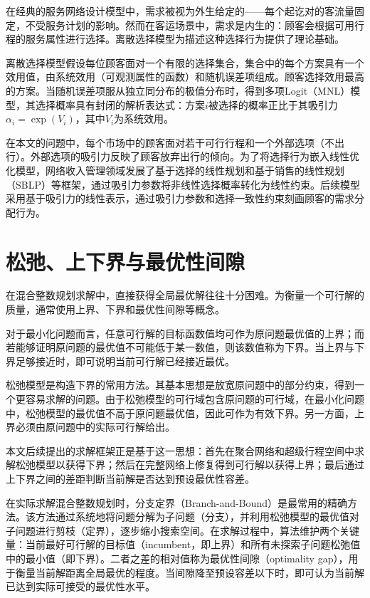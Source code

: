 在经典的服务网络设计模型中，需求被视为外生给定的——每个起讫对的客流量固定，不受服务计划的影响。然而在客运场景中，需求是内生的：顾客会根据可用行程的服务属性进行选择。离散选择模型为描述这种选择行为提供了理论基础。

离散选择模型假设每位顾客面对一个有限的选择集合，集合中的每个方案具有一个效用值，由系统效用（可观测属性的函数）和随机误差项组成\citep{mcfadden1974conditional, benakiva1985discrete, train2009discrete}。顾客选择效用最高的方案。当随机误差项服从独立同分布的极值分布时，得到多项Logit（MNL）模型，其选择概率具有封闭的解析表达式：方案$i$被选择的概率正比于其吸引力$\alpha_i = \exp(V_i)$，其中$V_i$为系统效用。

在本文的问题中，每个市场中的顾客面对若干可行行程和一个外部选项（不出行）。外部选项的吸引力反映了顾客放弃出行的倾向。为了将选择行为嵌入线性优化模型，网络收入管理领域发展了基于选择的线性规划\citep{liu2008choice}和基于销售的线性规划（SBLP）\citep{gallego2015general}等框架，通过吸引力参数将非线性选择概率转化为线性约束。后续模型采用基于吸引力的线性表示，通过吸引力参数和选择一致性约束刻画顾客的需求分配行为。

\section{松弛、上下界与最优性间隙}

在混合整数规划求解中，直接获得全局最优解往往十分困难。为衡量一个可行解的质量，通常使用上界、下界和最优性间隙等概念。

对于最小化问题而言，任意可行解的目标函数值均可作为原问题最优值的上界；而若能够证明原问题的最优值不可能低于某一数值，则该数值称为下界。当上界与下界足够接近时，即可说明当前可行解已经接近最优。

松弛模型是构造下界的常用方法。其基本思想是放宽原问题中的部分约束，得到一个更容易求解的问题。由于松弛模型的可行域包含原问题的可行域，在最小化问题中，松弛模型的最优值不高于原问题最优值，因此可作为有效下界。另一方面，上界必须由原问题中的实际可行解给出。

本文后续提出的求解框架正是基于这一思想：首先在聚合网络和超级行程空间中求解松弛模型以获得下界；然后在完整网络上修复得到可行解以获得上界；最后通过上下界之间的差距判断当前解是否达到预设最优性容差。

在实际求解混合整数规划时，分支定界（Branch-and-Bound）是最常用的精确方法\citep{land1960automatic}。该方法通过系统地将问题分解为子问题（分支），并利用松弛模型的最优值对子问题进行剪枝（定界），逐步缩小搜索空间。在求解过程中，算法维护两个关键量：当前最好可行解的目标值（incumbent，即上界）和所有未探索子问题松弛值中的最小值（即下界）。二者之差的相对值称为最优性间隙（optimality gap），用于衡量当前解距离全局最优的程度。当间隙降至预设容差以下时，即可认为当前解已达到实际可接受的最优性水平。

